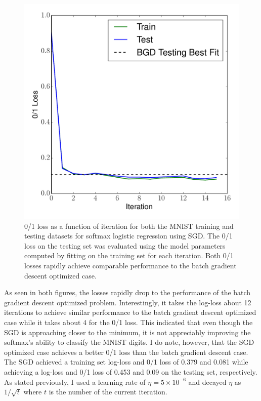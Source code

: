 \documentclass[12pt]{amsart}
\begin{document}
\begin{figure}[H]
	\includegraphics[width=\columnwidth]{sgd_mnist_multi_train_test_01.pdf}
    \caption{0/1 loss as a function of iteration for both the MNIST training and testing datasets for softmax logistic regression using SGD.  The 0/1 loss on the testing set was evaluated using the model parameters computed by fitting on the training set for each iteration.  Both 0/1 losses rapidly achieve comparable performance to the batch gradient descent optimized case.}
    \label{fig:sgd_mnist_01}
\end{figure}

As seen in both figures, the losses rapidly drop to the performance of the batch gradient descent optimized problem.  Interestingly, it takes the log-loss about 12 iterations to achieve similar performance to the batch gradient descent optimized case while it takes about 4 for the 0/1 loss.  This indicated that even though the SGD is approaching closer to the minimum, it is not appreciably improving the softmax's ability to classify the MNIST digits.  I do note, however, that the SGD optimized case achieves a better 0/1 loss than the batch gradient descent case.  The SGD achieved a training set log-loss and 0/1 loss of 0.379 and 0.081 while achieving a log-loss and 0/1 loss of 0.453 and 0.09 on the testing set, respectively.  As stated previously, I used a learning rate of $\eta = 5 \times 10^{-6}$ and decayed $\eta$ as $1/\sqrt{t}$ where $t$ is the number of the current iteration.
\end{document}
